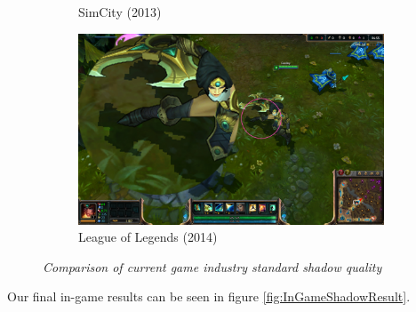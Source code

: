 \begin{figure}[H]
\begin{subfigure}{.5\textwidth}
  \caption{SimCity (2013)}
  \label{fig:SMExSimCity}
\end{subfigure}%
\begin{subfigure}{.5\textwidth}
  \centering
  \includegraphics[width=0.9\linewidth]{images/SMExLoL.jpg}
  \caption{League of Legends (2014)}
  \label{fig:SMExLoL}
\end{subfigure}
\caption[Game industry standard shadow quality comparison]{\textit{Comparison of current game industry standard shadow quality}}
\label{fig:SMExComparison}
\end{figure}
\newpage
Our final in-game results can be seen in figure \ref{fig:InGameShadowResult}.
